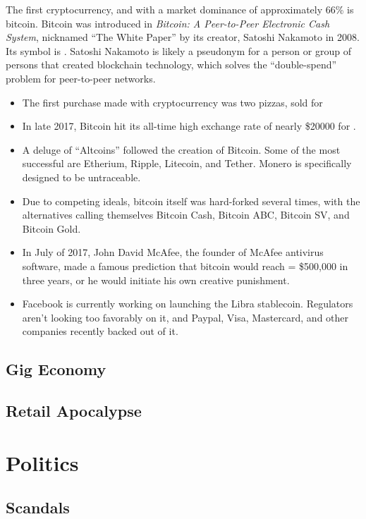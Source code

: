 		The first cryptocurrency, and with a market dominance of approximately 66\% is bitcoin.  Bitcoin was introduced in \textit{Bitcoin: A Peer-to-Peer Electronic Cash System}, nicknamed ``The White Paper'' by its creator, Satoshi Nakamoto in 2008.   Its symbol is \bitcoinA.  Satoshi Nakamoto is likely a pseudonym for a person or group of persons that created blockchain technology, which solves the ``double-spend'' problem for peer-to-peer networks.  
		\begin{itemize} 
			\item The first purchase made with cryptocurrency was two pizzas, sold for  
			\item In late 2017, Bitcoin hit its all-time high exchange rate of nearly \$20000 for . 
			\item A deluge of ``Altcoins'' followed the creation of Bitcoin.  Some of the most successful are Etherium, Ripple, Litecoin, and Tether.  Monero is specifically designed to be untraceable.
			\item Due to competing ideals, bitcoin itself was hard-forked several times, with the alternatives calling themselves Bitcoin Cash, Bitcoin ABC, Bitcoin SV, and Bitcoin Gold.  
			\item In July of 2017, John David McAfee, the founder of McAfee antivirus software, made a famous prediction that bitcoin would reach  = \$500,000 in three years, or he would initiate his own creative punishment.  
			\item Facebook is currently working on launching the Libra stablecoin.  Regulators aren't looking too favorably on it, and Paypal, Visa, Mastercard, and other companies recently backed out of it.
			
		\end{itemize}
		\subsection{Gig Economy}
		\subsection{Retail Apocalypse}
		
		
	\section{Politics}
		\subsection{Scandals}

